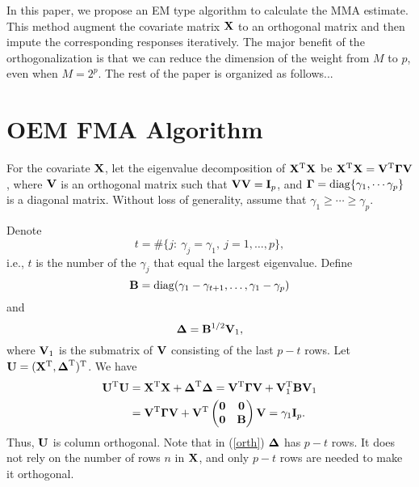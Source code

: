 \documentclass[12pt,hidelinks]{article}
\begin{document}
In this paper, we propose an EM type algorithm to calculate the MMA estimate. This method augment the covariate matrix $\mathbf{X}$ to an orthogonal matrix and then impute the corresponding responses iteratively. The major benefit of the orthogonalization is that we can reduce the dimension of the weight from $M$ to $p$, even when $M=2^p$. The rest of the paper is organized as follows... 

\section{OEM FMA Algorithm}


For the covariate $\mathbf{X}$, let the eigenvalue decomposition of $\mathbf{X}^{\rm T}\mathbf{X}$ be $\mathbf{X}^{\rm T}\mathbf{X}=\mathbf{V}^{\rm T}\boldsymbol{\Gamma}\mathbf{V}$, where $\mathbf{V}$ is an orthogonal matrix such that $\mathbf{V}\mathbf{V}=\mathbf{I}_p$, and $\boldsymbol{\Gamma}=\mathrm{diag}\{\gamma_1,\cdots\gamma_p\}$ is a diagonal matrix. Without loss of generality, assume that $\gamma_1\geqslant\cdots\geqslant\gamma_p$.

Denote
\begin{equation}\label{t}
t=\#\{j:\ \gamma_j=\gamma_1,\ j=1,\ldots,p\},
\end{equation}
i.e., $t$ is the number of the $\gamma_j$ that equal the largest eigenvalue. 
Define
\begin{equation}
\mathbf{B}={\mathrm{diag}}(\gamma_1 -\gamma_{t+1}, \ldots, \gamma_1-\gamma_p)\label{B}
\end{equation} and
\begin{equation}\label{orth}
\boldsymbol{\Delta}=\mathbf{B}^{1/2}\mathbf{V}_1,
\end{equation} where
$\mathbf{V}_1$ is the submatrix of $\mathbf{V}$ consisting of the last $p-t$ rows. Let $\mathbf{U}=(\mathbf{X}^{\rm T},\boldsymbol{\Delta}^{\rm T})^{\rm T}$. We have
\begin{align}
  \mathbf{U}^{\rm T}\mathbf{U}
  &=\mathbf{X}^{\rm T}\mathbf{X}+\boldsymbol{\Delta}^{\rm T}\boldsymbol{\Delta}
  =\mathbf{V}^{\rm T}\boldsymbol{\Gamma}\mathbf{V}+\mathbf{V}_1^{\rm T}\mathbf{B}\mathbf{V}_1\\
  &=\mathbf{V}^{\rm T}\boldsymbol{\Gamma}\mathbf{V}+\mathbf{V}^{\rm T}
    \begin{pmatrix}
      \mathbf{0} & \mathbf{0}\\ \mathbf{0} & \mathbf{B}
    \end{pmatrix}
    \mathbf{V}
  =\gamma_1\mathbf{I}_p.
\end{align}
Thus, $\mathbf{U}$ is column orthogonal. Note that in (\ref{orth}) $\boldsymbol{\Delta}$ has $p-t$ rows. It does not rely on the number of rows $n$ in $\mathbf{X}$, and only $p-t$ rows are needed to make it orthogonal.
\end{document}

